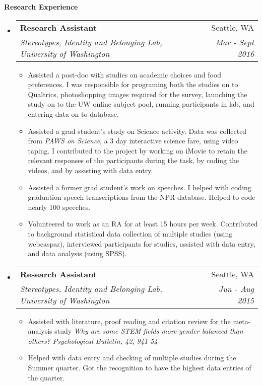 \documentclass[letterpaper,11pt]{article}
\makeatletter
\newcommand{\resheading}[1]{{\large \colorbox{mygrey}{\begin{minipage}{\textwidth}{\textbf{#1 \vphantom{p\^{E}}}}\end{minipage}}}}
\newcommand{\ressubheading}[4]{
\begin{tabular*}{7.0in}{l@{\extracolsep{\fill}}r}
      \textbf{#1} & #2 \\
            \textit{#3} & \textit{#4} \\
\end{tabular*}\vspace{-6pt}}
\makeatother
\begin{document}
\resheading{Research Experience}
\begin{itemize}
    \item
        \ressubheading{Research Assistant}{Seattle, WA}{Stereotypes, Identity and Belonging Lab, University of Washington}{Mar - Sept 2016}
        \begin{itemize}
            \item{Assisted a post-doc with studies on academic choices and food preferences. I was responsible for programing both the studies on to \textsf{Qualtrics}, photoshopping images required for the survey, launching the study on to the UW online subject pool, running participants in lab, and entering data on to database.}
            \item{Assisted a grad student's study on Science activity. Data was collected from \textit{PAWS on Science}, a 3 day interactive science fare, using video taping. I contributed to the project by working on iMovie to retain the relevant responses of the participants during the task, by coding the videos, and by assisting with data entry.}
          \item{Assisted a former grad student's work on speeches. I helped with coding graduation speech transcriptions from the NPR database. Helped to code nearly 100 speeches.}
          \item{Volunteered to work as an RA for at least 15 hours per week. Contributed to background statistical data collection of multiple studies (using \textsf{webcaspar}), interviewed participants for studies, assisted with data entry, and data analysis (using \textsf{SPSS}).} 
         \end{itemize}
    \item
        \ressubheading{Research Assistant}{Seattle, WA}{Stereotypes, Identity and Belonging Lab, University of Washington}{Jun - Aug 2015}
        \begin{itemize}
            \item{Assisted with literature, proof reading and citation review for the meta-analysis study \textit{Why are some STEM fields more gender balanced than others? Psychological Bulletin, 42, 941-54}}
             \item{Helped with data entry and checking of multiple studies during the Summer quarter. Got the recognition to have the highest data entries of the quarter.} 
         \end{itemize}              
\end{itemize}
\end{document}
